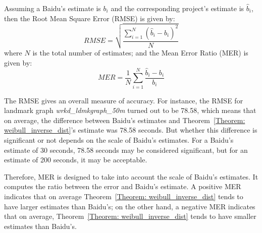 \begin{table}[h!]
\centering
{}
\caption{Summary of Evaluation Results}\label{Ta:eval_res}
\end{table}

Assuming a Baidu's estimate is $b_{i}$ and the corresponding project's estimate is $\hat{b}_{i}$, then the Root Mean Square Error (RMSE) is given by:
\begin{equation}
RMSE = \sqrt{\frac{\sum_{i = 1}^{N}(\hat{b}_{i} - b_{i})^{2}}{N}}
\end{equation}
where $N$ is the total number of estimates; and the Mean Error Ratio (MER) is given by:
\begin{equation}
MER = \frac{1}{N}\sum_{i = 1}^{N}\frac{\hat{b}_{i} - b_{i}}{b_{i}}
\end{equation}

The RMSE gives an overall measure of accuracy. For instance, the RMSE for landmark graph \emph{wrkd\_ldmkgraph\_50m} turned out to be 78.58, which means that on average, the difference between Baidu's estimates and Theorem~\ref{Theorem: weibull_inverse_dist}'s estimate was 78.58 seconds. But whether this difference is significant or not depends on the scale of Baidu's estimates. For a Baidu's estimate of 30 seconds, 78.58 seconds may be considered significant, but for an estimate of 200 seconds, it may be acceptable. 

Therefore, MER is designed to take into account the scale of Baidu's estimates. It computes the ratio between the error and Baidu's estimate. A positive MER indicates that on average Theorem~\ref{Theorem: weibull_inverse_dist} tends to have larger estimates than Baidu's; on the other hand, a negative MER indicates that on average, Theorem~\ref{Theorem: weibull_inverse_dist} tends to have smaller estimates than Baidu's. 

